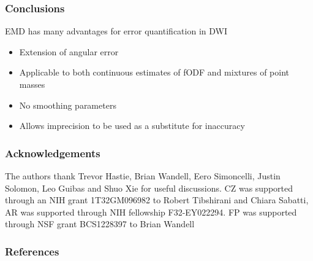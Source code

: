 \documentclass{beamer}
\begin{document}


\begin{frame}
\frametitle{Conclusions}
EMD has many advantages for error quantification in DWI
\begin{itemize}
\item Extension of angular error
\item Applicable to both continuous estimates of fODF and mixtures of point masses
\item No smoothing parameters
\item Allows imprecision to be used as a substitute for inaccuracy
\end{itemize}
\end{frame}

\begin{frame}
\frametitle{Acknowledgements}
The authors thank Trevor Hastie, Brian Wandell, Eero Simoncelli,
Justin Solomon, Leo Guibas and Shuo Xie for useful discussions. CZ was
supported through an NIH grant 1T32GM096982 to Robert Tibshirani and
Chiara Sabatti, AR was supported through NIH fellowship
F32-EY022294. FP was supported through NSF grant BCS1228397 to Brian
Wandell
\end{frame}

\begin{frame}
\frametitle{References}
\end{frame}
\end{document}
